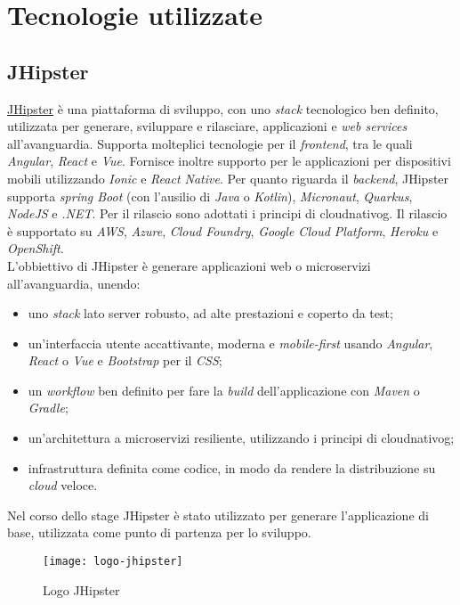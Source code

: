 \section{Tecnologie utilizzate}
\label{techs}

\subsection{JHipster}
\label{jhi}
\href{https://www.jhipster.tech/}{JHipster} è una piattaforma di sviluppo, con uno \textit{stack} tecnologico ben definito, utilizzata per generare, sviluppare e rilasciare, applicazioni e \textit{web services} all'avanguardia. Supporta molteplici tecnologie per il \textit{frontend}, tra le quali \textit{Angular}, \textit{React} e \textit{Vue}. Fornisce inoltre supporto per le applicazioni per dispositivi mobili utilizzando \textit{Ionic} e \textit{React Native}. Per quanto riguarda il \textit{backend}, JHipster supporta \textit{spring Boot} (con l'ausilio di \textit{Java} o \textit{Kotlin}), \textit{Micronaut}, \textit{Quarkus}, \textit{NodeJS} e \textit{.NET}. Per il rilascio sono adottati i principi di \gls{cloudnativog}\glsfirstoccur{}. Il rilascio è supportato su \textit{AWS}, \textit{Azure}, \textit{Cloud Foundry}, \textit{Google Cloud Platform}, \textit{Heroku} e \textit{OpenShift}.
\\L'obbiettivo di JHipster è generare applicazioni web o microservizi all'avanguardia, unendo:
\begin{itemize}
    \item uno \textit{stack} lato server robusto, ad alte prestazioni e coperto da test;
    \item un'interfaccia utente accattivante, moderna e \textit{mobile-first} usando \textit{Angular}, \textit{React} o \textit{Vue} e \textit{Bootstrap} per il \textit{CSS};
    \item un \textit{workflow} ben definito per fare la \textit{build} dell'applicazione con \textit{Maven} o \textit{Gradle};
    \item un'architettura a microservizi resiliente,  utilizzando i principi di \gls{cloudnativog};
    \item infrastruttura definita come codice, in modo da rendere la distribuzione su \textit{cloud} veloce.
\end{itemize}
Nel corso dello stage JHipster è stato utilizzato per generare l'applicazione di base, utilizzata come punto di partenza per lo sviluppo.
\begin{figure}[h]
    \begin{center}
    \texttt{[image: logo-jhipster]}
    \caption{Logo JHipster}
    \label{fig:figure2}
    \end{center}
\end{figure}

